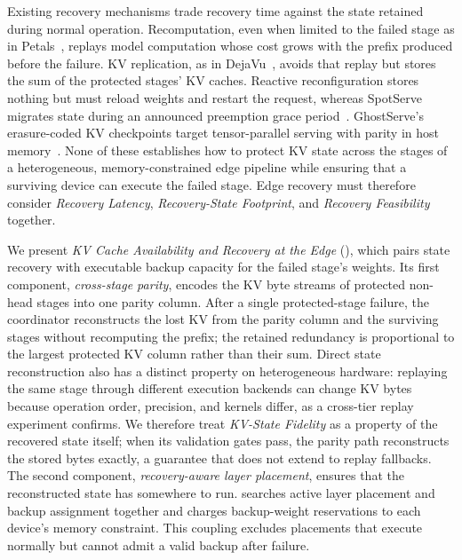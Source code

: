 Existing recovery mechanisms trade recovery time against the state retained
during normal operation.  Recomputation, even when limited to the failed
stage as in Petals~\cite{borzunov2023distributed}, replays model computation whose
cost grows with the prefix produced before the failure.  KV replication, as
in DejaVu~\cite{strati2024dejavu}, avoids that replay but stores the sum of
the protected stages' KV caches.  Reactive reconfiguration stores nothing but
must reload weights and restart the request, whereas SpotServe migrates state
during an announced preemption grace period~\cite{miao2024spotserve}.
GhostServe's erasure-coded KV checkpoints target tensor-parallel serving with
parity in host memory~\cite{jayakody2026ghostserve}.  None of these
establishes how to protect KV state across the stages of a heterogeneous,
memory-constrained edge pipeline while ensuring that a surviving device can
execute the failed stage.  Edge recovery must therefore consider
\emph{Recovery Latency}, \emph{Recovery-State Footprint}, and
\emph{Recovery Feasibility} together.

We present \emph{KV Cache Availability and Recovery at the Edge}
(\sys{}), which pairs state recovery with executable backup capacity for the failed
stage's weights.  Its first component, \emph{cross-stage parity}, encodes the KV
byte streams of protected non-head stages into one parity column.  After a
single protected-stage failure, the coordinator reconstructs the lost KV from
the parity column and the surviving stages without recomputing the prefix; the
retained redundancy is proportional to the largest protected KV column rather
than their sum.  Direct state reconstruction also has a distinct property on
heterogeneous hardware: replaying the same stage through different execution
backends can change KV bytes because operation order, precision, and kernels
differ, as a cross-tier replay experiment confirms.  We therefore treat
\emph{KV-State Fidelity} as a property of the recovered state itself; when
its validation gates pass, the parity path reconstructs the stored bytes
exactly, a guarantee that does not extend to replay fallbacks.  The second component, \emph{recovery-aware layer
placement}, ensures that the reconstructed state has somewhere to run.
\sys{} searches active layer placement and backup assignment together and
charges backup-weight reservations to each device's memory constraint.  This
coupling excludes placements that execute normally but cannot admit a valid
backup after failure.

